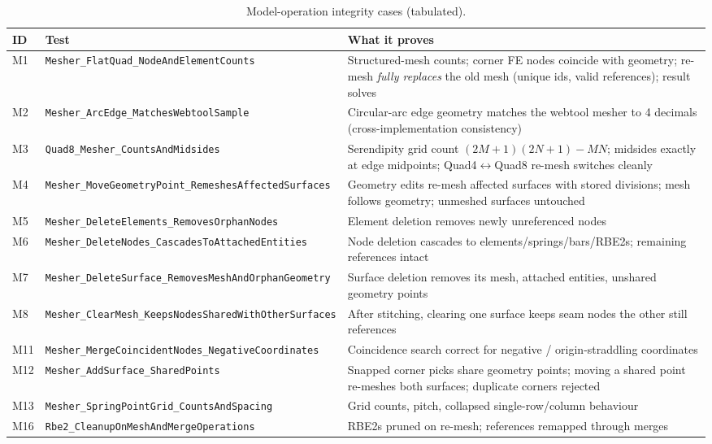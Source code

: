 \documentclass[11pt,a4paper]{article}
\begin{document}
\begin{table}[H]\small\centering
\begin{tabular}{@{}llp{8.6cm}@{}}
\toprule
ID & Test & What it proves \\
\midrule
M1 & \texttt{Mesher\_FlatQuad\_NodeAndElementCounts} & Structured-mesh counts; corner FE nodes coincide with geometry; re-mesh \emph{fully replaces} the old mesh (unique ids, valid references); result solves \\
M2 & \texttt{Mesher\_ArcEdge\_MatchesWebtoolSample} & Circular-arc edge geometry matches the webtool mesher to 4 decimals (cross-implementation consistency) \\
M3 & \texttt{Quad8\_Mesher\_CountsAndMidsides} & Serendipity grid count $(2M{+}1)(2N{+}1)-MN$; midsides exactly at edge midpoints; Quad4$\leftrightarrow$Quad8 re-mesh switches cleanly \\
M4 & \texttt{Mesher\_MoveGeometryPoint\_RemeshesAffectedSurfaces} & Geometry edits re-mesh affected surfaces with stored divisions; mesh follows geometry; unmeshed surfaces untouched \\
M5 & \texttt{Mesher\_DeleteElements\_RemovesOrphanNodes} & Element deletion removes newly unreferenced nodes \\
M6 & \texttt{Mesher\_DeleteNodes\_CascadesToAttachedEntities} & Node deletion cascades to elements/springs/bars/RBE2s; remaining references intact \\
M7 & \texttt{Mesher\_DeleteSurface\_RemovesMeshAndOrphanGeometry} & Surface deletion removes its mesh, attached entities, unshared geometry points \\
M8 & \texttt{Mesher\_ClearMesh\_KeepsNodesSharedWithOtherSurfaces} & After stitching, clearing one surface keeps seam nodes the other still references \\
M11 & \texttt{Mesher\_MergeCoincidentNodes\_NegativeCoordinates} & Coincidence search correct for negative / origin-straddling coordinates \\
M12 & \texttt{Mesher\_AddSurface\_SharedPoints} & Snapped corner picks share geometry points; moving a shared point re-meshes both surfaces; duplicate corners rejected \\
M13 & \texttt{Mesher\_SpringPointGrid\_CountsAndSpacing} & Grid counts, pitch, collapsed single-row/column behaviour \\
M16 & \texttt{Rbe2\_CleanupOnMeshAndMergeOperations} & RBE2s pruned on re-mesh; references remapped through merges \\
\bottomrule
\end{tabular}
\caption{Model-operation integrity cases (tabulated).}
\end{table}
\end{document}
